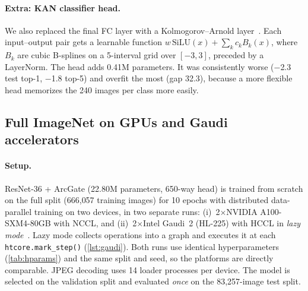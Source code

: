 \documentclass[10pt,twocolumn,letterpaper]{article}
\begin{document}
\paragraph{Extra: KAN classifier head.}
We also replaced the final FC layer with a Kolmogorov--Arnold layer~\cite{liu2024kan}. Each input--output pair gets a learnable function $w\,\text{SiLU}(x)+\sum_k c_k B_k(x)$, where $B_k$ are cubic B-splines on a 5-interval grid over $[-3,3]$, preceded by a LayerNorm. The head adds 0.41M parameters. It was consistently worse ($-$2.3 test top-1, $-$1.8 top-5) and overfit the most (gap 32.3), because a more flexible head memorizes the 240 images per class more easily.


\subsection{Full ImageNet on GPUs and Gaudi accelerators}
\label{sec:p3-4}
\paragraph{Setup.}
ResNet-36 + ArcGate (22.80M parameters, 650-way head) is trained from scratch on the full split (666{,}057 training images) for 10 epochs with distributed data-parallel training on two devices, in two separate runs:
(i)~2$\times$NVIDIA A100-SXM4-80GB with NCCL, and
(ii)~2$\times$Intel Gaudi~2 (HL-225) with HCCL in \emph{lazy mode}~\cite{habana2025docs}. Lazy mode collects operations into a graph and executes it at each \texttt{htcore.mark\_step()} (\cref{lst:gaudi}).
Both runs use identical hyperparameters (\cref{tab:hparams}) and the same split and seed, so the platforms are directly comparable. JPEG decoding uses 14 loader processes per device. The model is selected on the validation split and evaluated \emph{once} on the 83{,}257-image test split.
\end{document}
